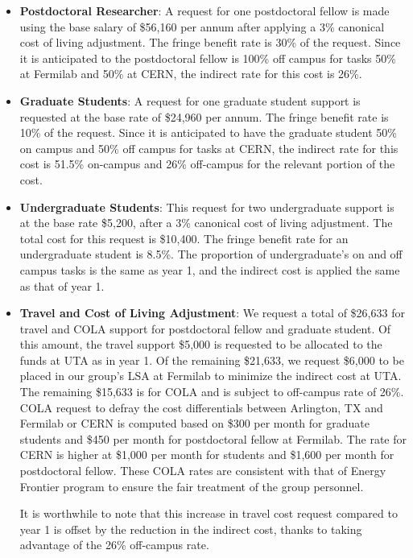 \begin{enumerate}
\begin{itemize}
\item {{\bf Postdoctoral Researcher}: A request for one postdoctoral fellow is made using the base salary of \$56,160 per annum after applying a 3\% canonical cost of living adjustment.  The fringe benefit rate is 30\% of the request.  Since it is anticipated to the postdoctoral fellow is 100\% off campus for tasks 50\% at Fermilab and 50\% at CERN, the indirect rate for this cost is 26\%.} 

\item{{\bf Graduate Students}: A request for one graduate student support is requested at the base rate of \$24,960 per annum.   The fringe benefit rate is 10\% of the request.  Since it is anticipated to have the graduate student 50\% on campus and 50\% off campus for tasks at CERN, the indirect rate for this cost is 51.5\% on-campus and 26\% off-campus for the relevant portion of the cost. }

\item {{\bf Undergraduate Students}: This request for two undergraduate support is at the base rate \$5,200, after a 3\% canonical cost of living adjustment.  The total cost for this request is \$10,400.  The fringe benefit rate for an undergraduate student is 8.5\%.  The proportion of undergraduate’s on and off campus tasks is the same as year 1, and the indirect cost is applied the same as that of year 1.}

\item{{\bf Travel and Cost of Living Adjustment}: We request a total of \$26,633 for travel and COLA support for postdoctoral fellow and graduate student.   Of this amount, the travel support \$5,000 is requested to be allocated to the funds at UTA as in year 1.  Of the remaining \$21,633, we request \$6,000 to be placed in our group’s LSA at Fermilab to minimize the indirect cost at UTA.   The remaining \$15,633 is for COLA and is subject to off-campus rate of 26\%.  COLA request to defray the cost differentials between Arlington, TX and Fermilab or CERN is computed based on \$300 per month for graduate students and \$450 per month for postdoctoral fellow at Fermilab.  The rate for CERN is higher at \$1,000 per month for students and \$1,600 per month for postdoctoral fellow.  These COLA rates are consistent with that of Energy Frontier program to ensure the fair treatment of the group personnel.

It is worthwhile to note that this increase in travel cost request compared to year 1 is offset by the reduction in the indirect cost, thanks to taking advantage of the 26\% off-campus rate.}


\end{itemize}
\end{enumerate}
